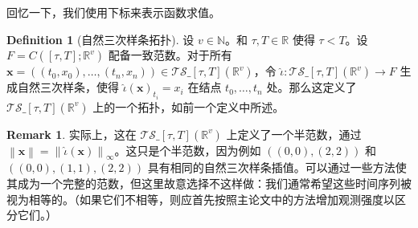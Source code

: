\documentclass{ctexart}
\theoremstyle{plain}
\theoremstyle{definition}
\newtheorem{definition}[thm]{Definition}
\newtheorem{remark}[thm]{Remark}
\newcommand{\ts}[2]{\mathcal{T\!S}\_{#1}\left(#2\right)}
\newcommand{\norm}[1]{\left\|#1\right\|}
\newcommand{\reals}{\mathbb{R}}
\newcommand{\naturals}{\mathbb{N}}
\begin{document}
	回忆一下，我们使用下标来表示函数求值。
\begin{definition}[自然三次样条拓扑]
	设 $v \in \naturals$。和 $\tau, T \in \reals$ 使得 $\tau < T$。设 $F = C([\tau, T]; \reals^v)$ 配备一致范数。对于所有 $\mathbf{x} = ((t_0, x_0), \ldots, (t_n, x_n)) \in \ts{[\tau, T]}{\reals^v}$，令 $\widehat{\iota} \colon \ts{[\tau, T]}{\reals^v} \to F$ 生成自然三次样条，使得 $\widehat{\iota}(\mathbf{x})_{t_i} = x_i$ 在结点 $t_0, \ldots, t_n$ 处。那么这定义了 $\ts{[\tau, T]}{\reals^v}$ 上的一个拓扑，如前一个定义中所述。
\end{definition}
\begin{remark}
	实际上，这在 $\ts{[\tau, T]}{\reals^v}$ 上定义了一个半范数，通过 $\norm{\mathbf{x}} = \norm{\widehat{\iota}(\mathbf{x})}_\infty$。这只是个半范数，因为例如 $((0, 0), (2, 2))$ 和 $((0, 0), (1, 1), (2, 2))$ 具有相同的自然三次样条插值。可以通过一些方法使其成为一个完整的范数，但这里故意选择不这样做：我们通常希望这些时间序列被视为相等的。（如果它们不相等，则应首先按照主论文中的方法增加观测强度以区分它们。）
\end{remark}
\end{document}
